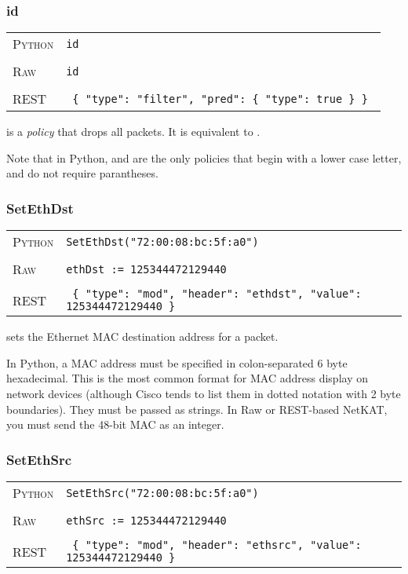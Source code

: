 \subsubsection{id}

\bigskip
\begin{tabularx}{\linewidth}{lX}
\textsc{Python}   & \texttt{id} \\ \\
\textsc{Raw}   & \texttt{id} \\ \\
\textsc{REST} & \texttt{ \{ "type": "filter", "pred": \{ "type": true \} \} } 
\end{tabularx}

 is a \emph{policy} that drops all packets.  It is equivalent to .

Note that in Python,  and  are the only policies that begin with a lower case
letter, and do not require parantheses.  

\subsubsection{SetEthDst}

\bigskip
\begin{tabularx}{\linewidth}{lX}
\textsc{Python}   & \texttt{SetEthDst("72:00:08:bc:5f:a0")} \\ \\
\textsc{Raw}    & \texttt{ethDst := 125344472129440}     \\ \\
\textsc{REST} & \texttt{ \{ "type": "mod", "header": "ethdst", "value": 125344472129440 \} }
\end{tabularx}

 sets the Ethernet MAC destination address for a packet.    

In Python, a MAC address must be specified in colon-separated 6 byte hexadecimal.  This is the most common format
for MAC address display on network devices (although Cisco tends to list them in dotted notation with 2 byte
boundaries).  They must be passed as strings.  In Raw or REST-based NetKAT, you must send the 48-bit MAC as 
an integer.  

\subsubsection{SetEthSrc}

\bigskip
\begin{tabularx}{\linewidth}{lX}
\textsc{Python}   & \texttt{SetEthSrc("72:00:08:bc:5f:a0")} \\ \\
\textsc{Raw}    & \texttt{ethSrc := 125344472129440}     \\ \\
\textsc{REST} & \texttt{ \{ "type": "mod", "header": "ethsrc", "value": 125344472129440 \} }
\end{tabularx}

